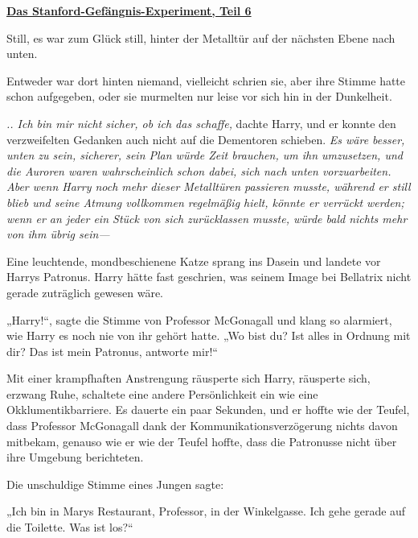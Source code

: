 

\hypertarget{das-stanford-gefuxe4ngnis-experiment-teil-6}{%

\textbf{\uline{Das Stanford-Gefängnis-Experiment, Teil 6}}

Still, es war zum Glück still, hinter der Metalltür auf der nächsten Ebene nach unten.

Entweder war dort hinten niemand, vielleicht schrien sie, aber ihre Stimme hatte schon aufgegeben, oder sie murmelten nur leise vor sich hin in der Dunkelheit.

\emph{.. Ich bin mir nicht sicher, ob ich das schaffe,} dachte Harry, und er konnte den verzweifelten Gedanken auch nicht auf die Dementoren schieben. \emph{Es wäre besser, unten zu sein, sicherer, sein Plan würde Zeit brauchen, um ihn umzusetzen, und die Auroren waren wahrscheinlich schon dabei, sich nach unten vorzuarbeiten. Aber wenn Harry noch mehr dieser Metalltüren passieren musste, während er still blieb und seine Atmung vollkommen regelmäßig hielt, könnte er verrückt werden; wenn er an jeder ein Stück von sich zurücklassen musste, würde bald nichts mehr von ihm übrig sein—}

Eine leuchtende, mondbeschienene Katze sprang ins Dasein und landete vor Harrys Patronus. Harry hätte fast geschrien, was seinem Image bei Bellatrix nicht gerade zuträglich gewesen wäre.

„Harry!“, sagte die Stimme von Professor McGonagall und klang so alarmiert, wie Harry es noch nie von ihr gehört hatte. „Wo bist du? Ist alles in Ordnung mit dir? Das ist mein Patronus, antworte mir!“

Mit einer krampfhaften Anstrengung räusperte sich Harry, räusperte sich, erzwang Ruhe, schaltete eine andere Persönlichkeit ein wie eine Okklumentikbarriere. Es dauerte ein paar Sekunden, und er hoffte wie der Teufel, dass Professor McGonagall dank der Kommunikationsverzögerung nichts davon mitbekam, genauso wie er wie der Teufel hoffte, dass die Patronusse nicht über ihre Umgebung berichteten.

Die unschuldige Stimme eines Jungen sagte:

„Ich bin in Marys Restaurant, Professor, in der Winkelgasse. Ich gehe gerade auf die Toilette. Was ist los?“

}
